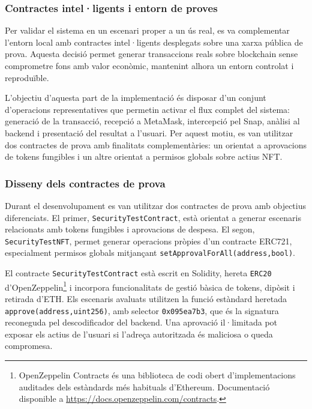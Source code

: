 \subsubsection{Contractes intel·ligents i entorn de proves}

Per validar el sistema en un escenari proper a un ús real, es va complementar l’entorn local amb contractes intel·ligents desplegats sobre una xarxa pública de prova. Aquesta decisió permet generar transaccions reals sobre blockchain sense comprometre fons amb valor econòmic, mantenint alhora un entorn controlat i reproduïble.

L’objectiu d’aquesta part de la implementació és disposar d’un conjunt d’operacions representatives que permetin activar el flux complet del sistema: generació de la transacció, recepció a MetaMask, intercepció pel Snap, anàlisi al backend i presentació del resultat a l’usuari. Per aquest motiu, es van utilitzar dos contractes de prova amb finalitats complementàries: un orientat a aprovacions de tokens fungibles i un altre orientat a permisos globals sobre actius NFT.

\subsubsection{Disseny dels contractes de prova}

Durant el desenvolupament es van utilitzar dos contractes de prova amb objectius diferenciats. El primer, \texttt{SecurityTestContract}, està orientat a generar escenaris relacionats amb tokens fungibles i aprovacions de despesa. El segon, \texttt{SecurityTestNFT}, permet generar operacions pròpies d’un contracte ERC721, especialment permisos globals mitjançant \texttt{setApprovalForAll(address,bool)}.

El contracte \texttt{SecurityTestContract} està escrit en Solidity, hereta \texttt{ERC20} d'OpenZeppelin\footnote{OpenZeppelin Contracts és una biblioteca de codi obert d'implementacions auditades dels estàndards més habituals d'Ethereum. Documentació disponible a \url{https://docs.openzeppelin.com/contracts}.} \cite{openzeppelin_contracts} i incorpora funcionalitats de gestió bàsica de tokens, dipòsit i retirada d'ETH. Els escenaris avaluats utilitzen la funció estàndard heretada \texttt{approve(address,uint256)}, amb selector \texttt{0x095ea7b3}, que és la signatura reconeguda pel descodificador del backend. Una aprovació il·limitada pot exposar els actius de l'usuari si l'adreça autoritzada és maliciosa o queda compromesa.

